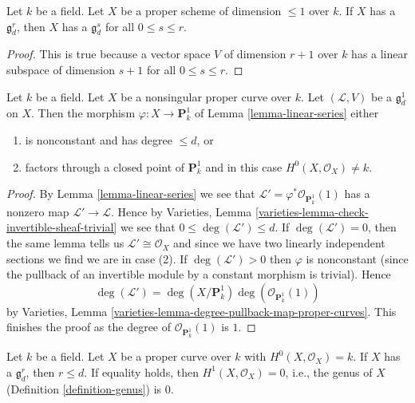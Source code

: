 \begin{lemma}
\label{lemma-linear-series-trivial-existence}
Let $k$ be a field. Let $X$ be a proper scheme of dimension $\leq 1$ over $k$.
If $X$ has a $\mathfrak g^r_d$, then $X$ has a $\mathfrak g^s_d$ for
all $0 \leq s \leq r$.
\end{lemma}

\begin{proof}
This is true because a vector space $V$ of dimension $r + 1$
over $k$ has a linear subspace of dimension $s + 1$ for all
$0 \leq s \leq r$.
\end{proof}

\begin{lemma}
\label{lemma-g1d}
Let $k$ be a field. Let $X$ be a nonsingular proper curve over $k$.
Let $(\mathcal{L}, V)$ be a $\mathfrak g^1_d$ on $X$. Then the morphism
$\varphi : X \to \mathbf{P}^1_k$ of Lemma \ref{lemma-linear-series}
either
\begin{enumerate}
\item is nonconstant and has degree $\leq d$, or
\item factors through a closed point of $\mathbf{P}^1_k$ and in this
case $H^0(X, \mathcal{O}_X) \not = k$.
\end{enumerate}
\end{lemma}

\begin{proof}
By Lemma \ref{lemma-linear-series} we see that
$\mathcal{L}' = \varphi^*\mathcal{O}_{\mathbf{P}^1_k}(1)$
has a nonzero map $\mathcal{L}' \to \mathcal{L}$.
Hence by Varieties, Lemma \ref{varieties-lemma-check-invertible-sheaf-trivial}
we see that $0 \leq \deg(\mathcal{L}') \leq d$.
If $\deg(\mathcal{L}') = 0$, then the same lemma tells us
$\mathcal{L}' \cong \mathcal{O}_X$ and since we have
two linearly independent sections we find we are in case (2).
If $\deg(\mathcal{L}') > 0$ then $\varphi$ is nonconstant (since the
pullback of an invertible module by a constant morphism is trivial).
Hence
$$
\deg(\mathcal{L}') =
\deg(X/\mathbf{P}^1_k) \deg(\mathcal{O}_{\mathbf{P}^1_k}(1))
$$
by Varieties, Lemma \ref{varieties-lemma-degree-pullback-map-proper-curves}.
This finishes the proof as the degree of
$\mathcal{O}_{\mathbf{P}^1_k}(1)$ is $1$.
\end{proof}

\begin{lemma}
\label{lemma-grd-inequalities}
Let $k$ be a field. Let $X$ be a proper curve over $k$ with
$H^0(X, \mathcal{O}_X) = k$. If $X$ has a $\mathfrak g^r_d$, then
$r \leq d$. If equality holds, then $H^1(X, \mathcal{O}_X) = 0$, i.e.,
the genus of $X$ (Definition \ref{definition-genus}) is $0$.
\end{lemma}

